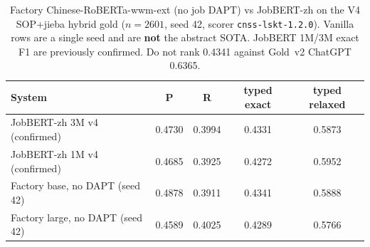 \begin{table}[t]
\centering
\small
\caption{Factory Chinese-RoBERTa-wwm-ext (no job DAPT) vs JobBERT-zh on the V4 SOP+jieba hybrid gold ($n{=}2601$, seed 42, scorer \texttt{cnss-lskt-1.2.0}). Vanilla rows are a single seed and are \textbf{not} the abstract SOTA. JobBERT 1M/3M exact F1 are previously confirmed. Do not rank 0.4341 against Gold~v2 ChatGPT 0.6365.}
\label{tab:vanilla-wwm-v4}
\begin{tabular}{lcccc}
\toprule
System & P & R & typed exact & typed relaxed \\
\midrule
JobBERT-zh 3M v4 (confirmed) & 0.4730 & 0.3994 & 0.4331 & 0.5873 \\
JobBERT-zh 1M v4 (confirmed) & 0.4685 & 0.3925 & 0.4272 & 0.5952 \\
Factory base, no DAPT (seed 42) & 0.4878 & 0.3911 & 0.4341 & 0.5888 \\
Factory large, no DAPT (seed 42) & 0.4589 & 0.4025 & 0.4289 & 0.5766 \\
\bottomrule
\end{tabular}
\end{table}
